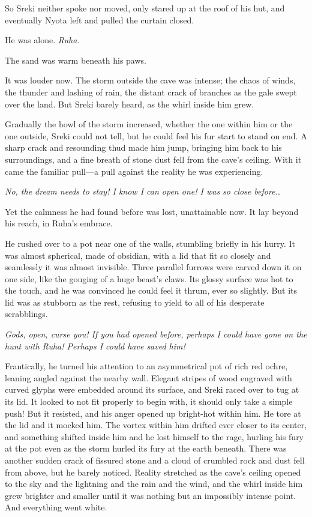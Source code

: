 So Sreki neither spoke nor moved, only stared up at the roof of his hut, and eventually Nyota left and pulled the curtain closed.

He was alone. \emph{Ruha.}

\secdiv

\noindent The sand was warm beneath his paws.

It was louder now. The storm outside the cave was intense; the chaos of winds, the thunder and lashing of rain, the distant crack of branches as the gale swept over the land. But Sreki barely heard, as the whirl inside him grew.

Gradually the howl of the storm increased, whether the one within him or the one outside, Sreki could not tell, but he could feel his fur start to stand on end. A sharp crack and resounding thud made him jump, bringing him back to his surroundings, and a fine breath of stone dust fell from the cave's ceiling. With it came the familiar pull---a pull against the reality he was experiencing.

\emph{No, the dream needs to stay! I know I can open one! I was so close before\ldots{}}

Yet the calmness he had found before was lost, unattainable now. It lay beyond his reach, in Ruha's embrace.

He rushed over to a pot near one of the walls, stumbling briefly in his hurry. It was almost spherical, made of obsidian, with a lid that fit so closely and seamlessly it was almost invisible. Three parallel furrows were carved down it on one side, like the gouging of a huge beast's claws. Its glossy surface was hot to the touch, and he was convinced he could feel it thrum, ever so slightly. But its lid was as stubborn as the rest, refusing to yield to all of his desperate scrabblings.

\emph{Gods, open, curse you! If you had opened before, perhaps I could have gone on the hunt with Ruha! Perhaps I could have saved him!}

Frantically, he turned his attention to an asymmetrical pot of rich red ochre, leaning angled against the nearby wall. Elegant stripes of wood engraved with curved glyphs were embedded around its surface, and Sreki raced over to tug at its lid. It looked to not fit properly to begin with, it should only take a simple push! But it resisted, and his anger opened up bright-hot within him. He tore at the lid and it mocked him. The vortex within him drifted ever closer to its center, and something shifted inside him and he lost himself to the rage, hurling his fury at the pot even as the storm hurled its fury at the earth beneath. There was another sudden crack of fissured stone and a cloud of crumbled rock and dust fell from above, but he barely noticed. Reality stretched as the cave's ceiling opened to the sky and the lightning and the rain and the wind, and the whirl inside him grew brighter and smaller until it was nothing but an impossibly intense point. And everything went white.

